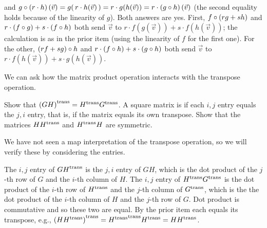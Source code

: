 \begin{exercises}
\begin{answer}
\begin{exparts}
          and 
          $g\mathbin\circ (r\cdot h)\,(\vec{v})=g(\,r\cdot h(\vec{v})\,)
            =r\cdot g(h(\vec{v}))
            =r\cdot (g\mathbin\circ h)\,(\vec{v})$
          (the second equality holds because of the linearity of $g$).
        \partsitem Both answers are yes.
          First, $f\mathbin\circ (rg+sh)$ and
          $r\cdot(f\mathbin\circ g)+s\cdot(f\mathbin\circ h)$ both send 
          $\vec{v}$ to $r\cdot f(g(\vec{v}))+s\cdot f(h(\vec{v}))$; the
          calculation is as in the prior item
          (using the linearity of $f$ for the first one). 
          For the other, 
          $(rf+sg)\mathbin\circ h$ and 
          $r\cdot(f\mathbin\circ h)+s\cdot(g\mathbin\circ h)$ both send
          $\vec{v}$ to $r\cdot f(h(\vec{v}))+s\cdot g(h(\vec{v}))$.
      \end{exparts}  
    \end{answer}
  \item \label{exer:TranspAndMult} 
    We can ask how the matrix product 
    operation interacts with the transpose operation. 
    \begin{exparts}  
      \partsitem Show that \( {{(GH)}^{\rm trans}}={{H}^{\rm trans}}{{G}^{\rm trans}} \).
      \partsitem A square matrix is 
         if each 
        \( i,j \) entry equals the
        \( j,i \) entry, that is, if the matrix equals its own transpose.
        Show that
        the matrices \( H{{H}^{\rm trans}} \) and \( {{H}^{\rm trans}}H \) are symmetric.
    \end{exparts}
    \begin{answer}
      We have not seen a map interpretation of the transpose operation, so
      we will verify these by considering the entries.
      \begin{exparts}
        \partsitem  The \( i,j \) entry of \( {{GH}^{\rm trans}} \) is the $j,i$ entry
          of $GH$, which is the dot product of the
          \( j \)-th row of \( G \) and the \( i \)-th column of \( H \).
          The \( i,j \) entry of \( {{H}^{\rm trans}}{{G}^{\rm trans}} \) is the dot product of
          the \( i \)-th row of \( {{H}^{\rm trans}} \) and the \( j \)-th column of
          \( {{G}^{\rm trans}} \), which is the
          the dot product of the \( i \)-th column of \( H \) and the
          \( j \)-th row of \( G \).
          Dot product is commutative and so these two are equal.
        \partsitem By the prior item each equals its transpose, e.g.,
          ${{(H{{H}^{\rm trans}})}^{\rm trans}}={{{{H}^{\rm trans}}}^{\rm trans}}{{H}^{\rm trans}}=H{{H}^{\rm trans}}$.

\end{exparts}
\end{answer}
\end{exercises}
